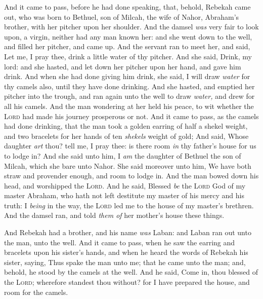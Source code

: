 \documentclass[11pt,letterpaper,oneside]{memoir}
\begin{document}
And it came to pass, before he had done speaking, that, behold, Rebekah
came out, who was born to Bethuel, son of Milcah, the wife of Nahor,
Abraham's brother, with her pitcher upon her shoulder. And the damsel
\emph{was} very fair to look upon, a virgin, neither had any man known
her: and she went down to the well, and filled her pitcher, and came up.
And the servant ran to meet her, and said, Let me, I pray thee, drink a
little water of thy pitcher. And she said, Drink, my lord: and she
hasted, and let down her pitcher upon her hand, and gave him drink. And
when she had done giving him drink, she said, I will draw \emph{water}
for thy camels also, until they have done drinking. And she hasted, and
emptied her pitcher into the trough, and ran again unto the well to draw
\emph{water,} and drew for all his camels. And the man wondering at her
held his peace, to wit whether the \textsc{Lord} had made his journey
prosperous or not. And it came to pass, as the camels had done drinking,
that the man took a golden earring of half a shekel weight, and two
bracelets for her hands of ten \emph{shekels} weight of gold; And said,
Whose daughter \emph{art} thou? tell me, I pray thee: is there room
\emph{in} thy father's house for us to lodge in? And she said unto him,
I \emph{am} the daughter of Bethuel the son of Milcah, which she bare
unto Nahor. She said moreover unto him, We have both straw and provender
enough, and room to lodge in. And the man bowed down his head, and
worshipped the \textsc{Lord}. And he said, Blessed \emph{be} the
\textsc{Lord} God of my master Abraham, who hath not left destitute my
master of his mercy and his truth: I \emph{being} in the way, the
\textsc{Lord} led me to the house of my master's brethren. And the damsel
ran, and told \emph{them of} her mother's house these things.

And Rebekah had a brother, and his name \emph{was} Laban: and Laban ran
out unto the man, unto the well. And it came to pass, when he saw the
earring and bracelets upon his sister's hands, and when he heard the
words of Rebekah his sister, saying, Thus spake the man unto me; that he
came unto the man; and, behold, he stood by the camels at the well. And
he said, Come in, thou blessed of the \textsc{Lord}; wherefore standest
thou without? for I have prepared the house, and room for the camels.
\end{document}
